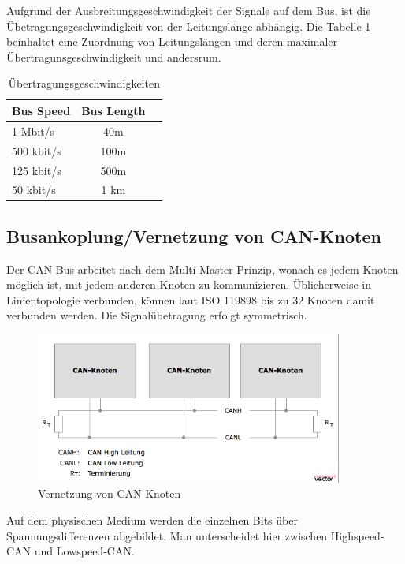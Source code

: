 Aufgrund der Ausbreitungsgeschwindigkeit der Signale auf dem Bus, ist die 
Übetragungsgeschwindigkeit von der Leitungslänge abhängig. Die Tabelle 
\ref{tab:speed} beinhaltet eine Zuordnung von Leitungslängen und deren 
maximaler Übertragunsgeschwindigkeit und andersrum.

\begin{table}[h]
	\centering
	\begin{tabular}{lcr}
		Bus Speed & Bus Length \\
		\hline
		1 Mbit/s & 40m \\
		500 kbit/s & 100m \\
		125 kbit/s & 500m \\
		50 kbit/s & 1 km \\
	\end{tabular}
	\label{tab:speed}
	\caption{Übertragungsgeschwindigkeiten}
\end{table}

\subsection{Busankoplung/Vernetzung von CAN-Knoten}

Der CAN Bus arbeitet nach dem Multi-Master Prinzip, wonach es jedem Knoten 
möglich ist, mit jedem anderen Knoten zu kommunizieren. Üblicherweise in 
Linientopologie verbunden, können laut ISO 119898 bis zu 32 Knoten damit
verbunden werden. Die Signalübetragung erfolgt symmetrisch.

\begin{figure}[h] 
\centering
\includegraphics[width=0.9\textwidth]{figures/cannet}
\caption{Vernetzung von CAN Knoten \citep{VEC}} 
\label{pic:cannet}
\end{figure} 

Auf dem physischen Medium werden die einzelnen Bits über Spannungsdifferenzen
abgebildet. Man unterscheidet hier zwischen Highspeed-CAN und Lowspeed-CAN.

